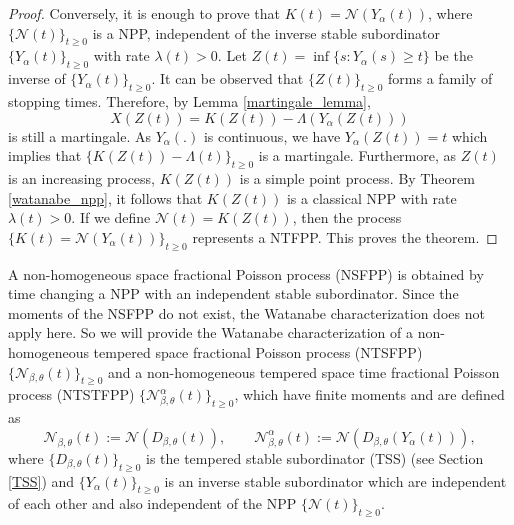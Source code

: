 \documentclass[11pt,oneside,reqno]{amsart}
\theoremstyle{definition}
\theoremstyle{remarkstyle}
\begin{document}
\begin{proof}
   Conversely, it is enough to prove that $K(t)=\mathcal{N}\left(Y_{\alpha}(t)\right)$, where $\{\mathcal{N}(t)\}_{t\ge 0}$ is a NPP, independent of the inverse stable subordinator $\{Y_{\alpha}(t)\}_{t\ge 0}$ with rate $\lambda(t)>0$. Let $Z(t)=\inf\{s:Y_{\alpha}(s)\ge t\}$ be the inverse of $\{Y_{\alpha}(t)\}_{t\ge 0}$. It can be observed that $\{Z(t)\}_{t\ge 0}$ forms a family of stopping times. Therefore, by Lemma \ref{martingale_lemma}, 
   \begin{equation*}
       X\left(Z(t)\right)=K(Z(t))-\Lambda\left( Y_{\alpha}(Z(t))\right)
   \end{equation*} is still a martingale. As $Y_{\alpha}(.)$ is continuous, we have $Y_{\alpha}(Z(t))=t$ which implies that $\{K(Z(t))-\Lambda(t)\}_{t\ge 0}$ is a martingale. Furthermore, as $Z(t)$ is an increasing process, $K(Z(t))$ is a simple point process. By Theorem \ref{watanabe_npp}, it follows that $K(Z(t))$ is a classical NPP with rate $\lambda(t)>0$. If we define $\mathcal{N}(t)=K(Z(t))$, then the process $\{K(t)=\mathcal{N}(Y_{\alpha}(t))\}_{t\ge 0}$ represents a NTFPP. This proves the theorem.
\end{proof}
A non-homogeneous space fractional Poisson process (NSFPP) is obtained by time changing a NPP with an independent stable subordinator. Since the moments of the NSFPP do not exist, the Watanabe characterization does not apply here. So we will provide the Watanabe characterization of a non-homogeneous tempered space fractional Poisson process (NTSFPP) $\{\mathcal{N}_{\beta,\theta}(t)\}_{t\ge 0}$ and a non-homogeneous tempered space time fractional Poisson process (NTSTFPP) $\{\mathcal{N}^{\alpha}_{\beta,\theta}(t)\}_{t\ge 0}$, which have finite moments and are defined as
\begin{equation*}
    \mathcal{N}_{\beta,\theta}(t):=\mathcal{N}\left(D_{\beta,\theta}(t)\right),\qquad \mathcal{N}^{\alpha}_{\beta,\theta}(t):=\mathcal{N}\left(D_{\beta,\theta}(Y_{\alpha}(t))\right), 
\end{equation*}
where $\{D_{\beta,\theta}(t)\}_{t\ge 0}$ is the tempered stable subordinator (TSS) (see Section \ref{TSS}) and $\{Y_\alpha(t)\}_{t\ge 0}$ is an inverse stable subordinator which are independent of each other and also independent of the NPP $\{\mathcal{N}(t)\}_{t\ge 0}$.
\end{document}
